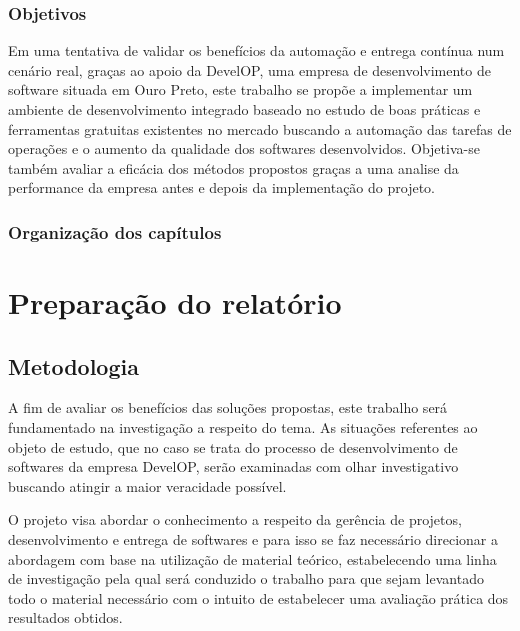 \documentclass[
	12pt,				%
	openright,			%
	twoside,			%
	a4paper,			%
	english,			%
	french,				%
	spanish,			%
	brazil,				%
	]{abntex2}
\begin{document}
\section{Objetivos}

Em uma tentativa de validar os benefícios da automação e entrega contínua num cenário real, graças ao apoio da DevelOP, uma empresa de desenvolvimento de software situada em Ouro Preto, este trabalho se propõe a implementar um ambiente de desenvolvimento integrado baseado no estudo de boas práticas e ferramentas gratuitas existentes no mercado buscando a automação das tarefas de operações e o aumento da qualidade dos softwares desenvolvidos. Objetiva-se também avaliar a eficácia dos métodos propostos graças a uma analise da performance da empresa antes e depois da implementação do projeto.

\section{Organização dos capítulos}

\part{Preparação do relatório}

\chapter{Metodologia}

A fim de avaliar os benefícios das soluções propostas, este trabalho será fundamentado na investigação a respeito do tema. As situações referentes ao objeto de estudo, que no caso se trata do processo de desenvolvimento de softwares da empresa DevelOP, serão examinadas com olhar investigativo buscando atingir a maior veracidade possível.

O projeto visa abordar o conhecimento a respeito da gerência de projetos, desenvolvimento e entrega de softwares e para isso se faz necessário direcionar a abordagem com base na utilização de material teórico, estabelecendo uma linha de investigação pela qual será conduzido o trabalho para que sejam levantado todo o material necessário com o intuito de estabelecer uma avaliação prática dos resultados obtidos.
\end{document}
